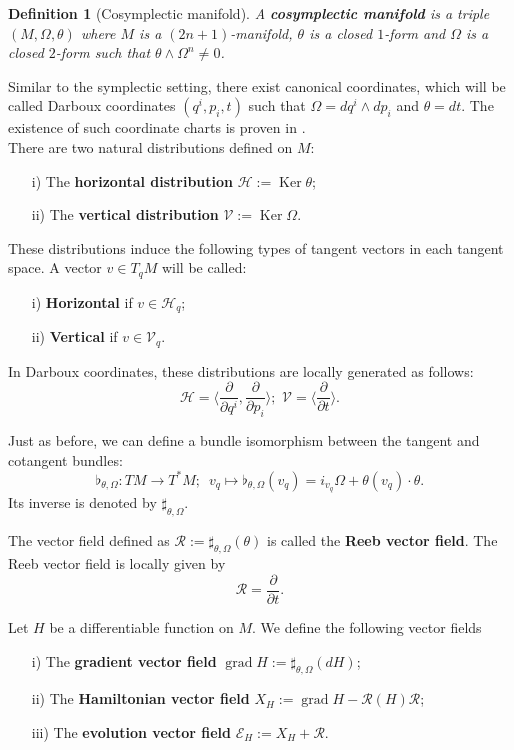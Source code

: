 \documentclass[12pt]{article}
\newtheorem{Def}{Definition}[section]
\renewcommand{\ker}{\operatorname{Ker}}
\newcommand{\grad}{\operatorname{grad}}
\begin{document}
\begin{Def}[Cosymplectic manifold] A \textbf{cosymplectic manifold} is a triple $(M,\Omega, \theta)$ where $M$ is a $(2n +
1)$-manifold, $\theta$ is a closed $1$-form and $\Omega$ is a closed $2$-form such that $\theta \wedge \Omega^n\neq 0$.
\end{Def} 
Similar to the symplectic setting, there exist canonical coordinates, which will be called Darboux coordinates $(q^i,p_i,t)$ such that $\Omega = dq^i \wedge dp_i$ and $\theta = dt$. The existence of such coordinate charts is proven in \cites{godbillon1969geometrie}.\\

There are two natural distributions defined on $M$: \begin{itemize} \item[i)] The \textbf{horizontal distribution} $\mathcal{H} :=
\ker \theta$; \item[ii)] The \textbf{vertical distribution} $\mathcal{V}:= \ker \Omega$. \end{itemize}
These distributions induce the following types of tangent vectors in each tangent space. A vector $v  \in T_qM$ will be called:

\begin{itemize}
\item[i)] \textbf{Horizontal} if $v \in \mathcal{H}_q$;
\item[ii)] \textbf{Vertical} if $v \in \mathcal{V}_q$.
\end{itemize}
In Darboux coordinates, these distributions are locally generated as follows: $$\mathcal{H} = \langle \frac{\partial}{\partial q^i}, \frac{\partial}{\partial p_i} \rangle; \,\, \mathcal{V} = \langle \frac{\partial}{\partial t} \rangle.$$

Just as before, we can define a bundle isomorphism between the tangent and cotangent bundles:
$$\flat_{\theta,\Omega}: TM \rightarrow T^*M;\,\,\, v_q \mapsto \flat_{\theta, \Omega}(v_q) = i_{v_q}\Omega +
\theta(v_q)\cdot \theta.$$
Its inverse is denoted by $\sharp_{\theta, \Omega}$.

The vector field defined as $\mathcal{R} := \sharp_{\theta, \Omega}(\theta)$ is called the \textbf{Reeb vector field}. The Reeb vector field is locally given by $$\mathcal{R}  = \frac{\partial}{\partial t}.$$

Let $H$ be a differentiable function on $M$. We define the following vector fields
\begin{itemize}
\item[i)] The \textbf{gradient vector field} $\grad H := \sharp_{\theta, \Omega} (dH)$;
\item[ii)] The \textbf{Hamiltonian vector field} $X_H := \grad H - \mathcal{R}(H) \mathcal{R}$;
\item[iii)] The \textbf{evolution vector field} $\mathcal{E}_H := X_H + \mathcal{R}.$
\end{itemize}
\end{document}

